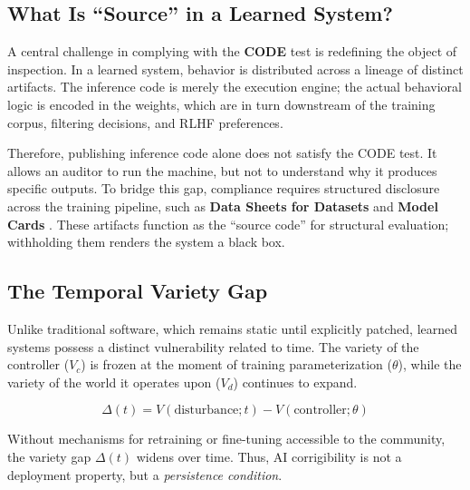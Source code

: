 \documentclass{article}
\begin{document}
\subsection{What Is ``Source'' in a Learned System?}

A central challenge in complying with the \textbf{CODE} test is redefining the object of inspection. In a learned system, behavior is distributed across a lineage of distinct artifacts. The inference code is merely the execution engine; the actual behavioral logic is encoded in the weights, which are in turn downstream of the training corpus, filtering decisions, and RLHF preferences.

Therefore, publishing inference code alone does not satisfy the CODE test. It allows an auditor to run the machine, but not to understand why it produces specific outputs. To bridge this gap, compliance requires structured disclosure across the training pipeline, such as \textbf{Data Sheets for Datasets} \citep{gebru2021} and \textbf{Model Cards} \citep{mitchell2019}. These artifacts function as the ``source code'' for structural evaluation; withholding them renders the system a black box.

\subsection{The Temporal Variety Gap}

Unlike traditional software, which remains static until explicitly patched, learned systems possess a distinct vulnerability related to time. The variety of the controller ($V_c$) is frozen at the moment of training parameterization ($\theta$), while the variety of the world it operates upon ($V_d$) continues to expand.

\begin{equation}
\Delta(t) = V(\text{disturbance}; t) - V(\text{controller}; \theta)
\end{equation}

Without mechanisms for retraining or fine-tuning accessible to the community, the variety gap $\Delta(t)$ widens over time. Thus, AI corrigibility is not a deployment property, but a \textit{persistence condition}.
\end{document}
